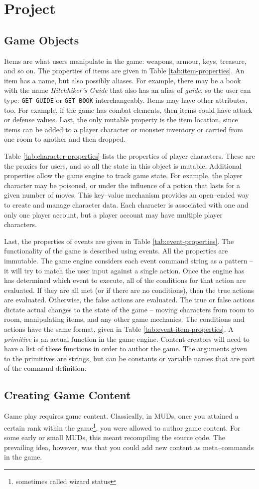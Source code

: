 \documentclass{article}
\newcommand{\enterProblemHeader}[1]{
}
\newcommand{\exitProblemHeader}[1]{
\nobreak\extramarks{#1}{}\nobreak
}
\newcounter{homeworkProblemCounter} %
\newcommand{\homeworkProblemName}{}
\newenvironment{homeworkProblem}[1][Problem \arabic{homeworkProblemCounter}]{ %
\stepcounter{homeworkProblemCounter} %
\renewcommand{\homeworkProblemName}{#1} %
\section{\homeworkProblemName} %
\enterProblemHeader{\homeworkProblemName} %
}{
\exitProblemHeader{\homeworkProblemName} %
}
\newcommand{\homeworkSectionName}{}
\newenvironment{homeworkSection}[1]{ %
\renewcommand{\homeworkSectionName}{#1} %
\subsection{\homeworkSectionName} %
\enterProblemHeader{\homeworkProblemName\ [\homeworkSectionName]} %
}{
\enterProblemHeader{\homeworkProblemName} %
}
\begin{document}
\begin{homeworkProblem}[Project]
\begin{homeworkSection}{Game Objects}
	Items are what users manipulate in the game: weapons, armour, keys, treasure, and so on. The properties of items are given in Table \ref{tab:item-properties}. An item has a name, but also possibly aliases. For example, there may be a book with the name \textit{Hitchhiker's Guide} that also has an alias of \textit{guide}, so the user can type: \texttt{GET GUIDE} or \texttt{GET BOOK} interchangeably. Items may have other attributes, too. For example, if the game has combat elements, then items could have attack or defense values. Last, the only mutable property is the item location, since items can be added to a player character or monster inventory or carried from one room to another and then dropped.

	Table \ref{tab:character-properties} lists the properties of player characters. These are the proxies for users, and so all the state in this object is mutable. Additional properties allow the game engine to track game state. For example, the player character may be poisoned, or under the influence of a potion that lasts for a given number of moves. This key--value mechanism provides an open--ended way to create and manage character data. Each character is associated with one and only one player account, but a player account may have multiple player characters.

	Last, the properties of events are given in Table \ref{tab:event-properties}. The functionality of the game is described using events. All the properties are immutable. The game engine considers each event command string as a pattern -- it will try to match the user input against a single action. Once the engine has has determined which event to execute, all of the conditions for that action are evaluated. If they are all met (or if there are no conditions), then the true actions are evaluated. Otherwise, the false actions are evaluated. The true or false actions dictate actual changes to the state of the game -- moving characters from room to room, manipulating items, and any other game mechanics. The conditions and actions have the same format, given in Table \ref{tab:event-item-properties}. A \textit{primitive} is an actual function in the game engine. Content creators will need to have a list of these functions in order to author the game. The arguments given to the primitives are strings, but can be constants or variable names that are part of the command definition.
\end{homeworkSection}

\begin{homeworkSection}{Creating Game Content}
	Game play requires game content. Classically, in MUDs, once you attained a certain rank within the game\footnote{sometimes called wizard status}, you were allowed to author game content. For some early or small MUDs, this meant recompiling the source code. The prevailing idea, however, was that you could add new content as meta--commands in the game.


\end{homeworkSection}
\end{homeworkProblem}
\end{document}
